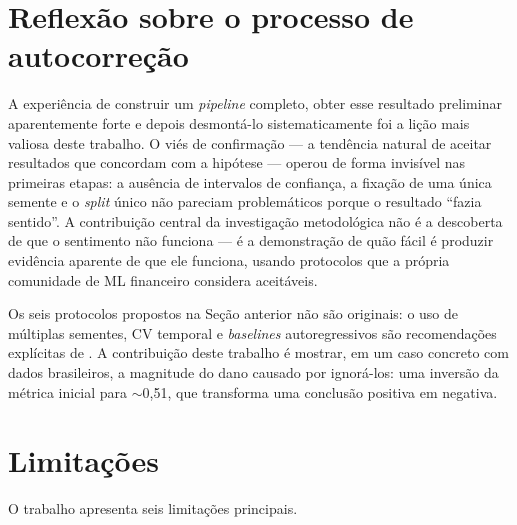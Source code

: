\section{Reflexão sobre o processo de autocorreção}

A experiência de construir um \textit{pipeline} completo, obter esse resultado preliminar aparentemente forte e depois desmontá-lo sistematicamente foi a lição mais valiosa deste trabalho. O viés de confirmação --- a tendência natural de aceitar resultados que concordam com a hipótese --- operou de forma invisível nas primeiras etapas: a ausência de intervalos de confiança, a fixação de uma única semente e o \textit{split} único não pareciam problemáticos porque o resultado ``fazia sentido''. A contribuição central da investigação metodológica não é a descoberta de que o sentimento não funciona --- é a demonstração de quão fácil é produzir evidência aparente de que ele funciona, usando protocolos que a própria comunidade de ML financeiro considera aceitáveis.

Os seis protocolos propostos na Seção anterior não são originais: o uso de múltiplas sementes, CV temporal e \textit{baselines} autoregressivos são recomendações explícitas de . A contribuição deste trabalho é mostrar, em um caso concreto com dados brasileiros, a magnitude do dano causado por ignorá-los: uma inversão da métrica inicial para $\sim$0,51, que transforma uma conclusão positiva em negativa.

\section{Limitações}\label{sec:limitacoes}

O trabalho apresenta seis limitações principais.

